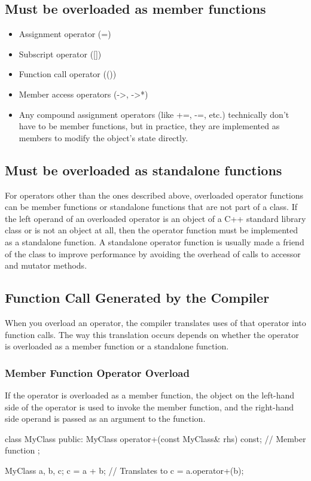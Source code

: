 \documentclass{report}
\begin{document}
    \bigbreak \noindent 
    \subsection{Must be overloaded as member functions}
    \begin{itemize}
        \item Assignment operator (=)
        \item Subscript operator ([])
        \item Function call operator (())
        \item Member access operators (->, ->*)
        \item Any compound assignment operators (like +=, -=, etc.) technically don't have to be member functions, but in practice, they are implemented as members to modify the object's state directly.
    \end{itemize}
    \bigbreak \noindent 

    \bigbreak \noindent 
    \subsection{Must be overloaded as standalone functions}
    \bigbreak \noindent 
    For operators other than the ones described above, overloaded operator functions can be member functions or standalone functions that are not part of a class.
    \bigbreak \noindent 
    If the left operand of an overloaded operator is an object of a C++ standard library class or is not an object at all, then the operator function must be implemented as a standalone function. A standalone operator function is usually made a friend of the class to improve performance by avoiding the overhead of calls to accessor and mutator methods.
    \bigbreak \noindent 
    \subsection{Function Call Generated by the Compiler}
    \bigbreak \noindent 
    When you overload an operator, the compiler translates uses of that operator into function calls. The way this translation occurs depends on whether the operator is overloaded as a member function or a standalone function.
    \bigbreak \noindent 
    \subsubsection{Member Function Operator Overload}
    \bigbreak \noindent 
     If the operator is overloaded as a member function, the object on the left-hand side of the operator is used to invoke the member function, and the right-hand side operand is passed as an argument to the function.
     \bigbreak \noindent 
     \begin{cppcode}
         class MyClass {
             public:
             MyClass operator+(const MyClass& rhs) const; // Member function
         };

         MyClass a, b, c;
         c = a + b; // Translates to c = a.operator+(b);
     \end{cppcode}
\end{document}
